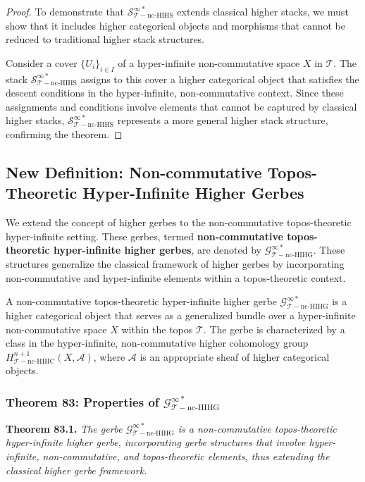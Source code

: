 \documentclass{article}
\begin{document}
\begin{proof}
To demonstrate that \(\mathcal{S}_{\mathcal{T}-\text{nc-HIHS}}^{\infty *}\) extends classical higher stacks, we must show that it includes higher categorical objects and morphisms that cannot be reduced to traditional higher stack structures.

Consider a cover \(\{U_i\}_{i \in I}\) of a hyper-infinite non-commutative space \(X\) in \(\mathcal{T}\). The stack \(\mathcal{S}_{\mathcal{T}-\text{nc-HIHS}}^{\infty *}\) assigns to this cover a higher categorical object that satisfies the descent conditions in the hyper-infinite, non-commutative context. Since these assignments and conditions involve elements that cannot be captured by classical higher stacks, \(\mathcal{S}_{\mathcal{T}-\text{nc-HIHS}}^{\infty *}\) represents a more general higher stack structure, confirming the theorem.
\end{proof}

\subsection{New Definition: Non-commutative Topos-Theoretic Hyper-Infinite Higher Gerbes}
We extend the concept of higher gerbes to the non-commutative topos-theoretic hyper-infinite setting. These gerbes, termed \textbf{non-commutative topos-theoretic hyper-infinite higher gerbes}, are denoted by \(\mathcal{G}_{\mathcal{T}-\text{nc-HIHG}}^{\infty *}\). These structures generalize the classical framework of higher gerbes by incorporating non-commutative and hyper-infinite elements within a topos-theoretic context.

A non-commutative topos-theoretic hyper-infinite higher gerbe \(\mathcal{G}_{\mathcal{T}-\text{nc-HIHG}}^{\infty *}\) is a higher categorical object that serves as a generalized bundle over a hyper-infinite non-commutative space \(X\) within the topos \(\mathcal{T}\). The gerbe is characterized by a class in the hyper-infinite, non-commutative higher cohomology group \(H_{\mathcal{T}-\text{nc-HIHC}}^{n+1}(X, \mathcal{A})\), where \(\mathcal{A}\) is an appropriate sheaf of higher categorical objects.

\subsubsection{Theorem 83: Properties of \(\mathcal{G}_{\mathcal{T}-\text{nc-HIHG}}^{\infty *}\)}
\textbf{Theorem 83.1.} \textit{The gerbe \(\mathcal{G}_{\mathcal{T}-\text{nc-HIHG}}^{\infty *}\) is a non-commutative topos-theoretic hyper-infinite higher gerbe, incorporating gerbe structures that involve hyper-infinite, non-commutative, and topos-theoretic elements, thus extending the classical higher gerbe framework.}
\end{document}
